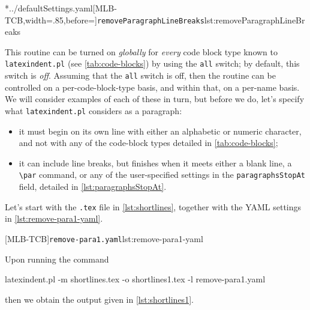 	\cmhlistingsfromfile[style=removeParagraphLineBreaks]*{../defaultSettings.yaml}[MLB-TCB,width=.85\linewidth,before=\centering]{\texttt{removeParagraphLineBreaks}}{lst:removeParagraphLineBreaks}

	This routine can be turned on \emph{globally} for \emph{every}
	code block type known to \texttt{latexindent.pl}
	(see \vref{tab:code-blocks}) by using the
	\texttt{all} switch; by default, this switch is
	\emph{off}. Assuming that the \texttt{all} switch is off,
	then the routine can be controlled on a per-code-block-type basis, and within that, on a
	per-name basis. We will consider examples of each of these in turn, but before we do,
	let's specify what \texttt{latexindent.pl} considers as a paragraph:
	\begin{itemize}
		\item it must begin on its own line with either an alphabetic or numeric character, and not
		      with any of the code-block types detailed in \vref{tab:code-blocks};
		\item it can include line breaks, but finishes when it meets either a blank line, a
		      \lstinline!\par! command, or any of the user-specified settings in the
		      \texttt{paragraphsStopAt} field, detailed in \vref{lst:paragraphsStopAt}.
	\end{itemize}

	Let's start with the \texttt{.tex} file in \cref{lst:shortlines},
	together with the YAML settings in \cref{lst:remove-para1-yaml}.

	\begin{minipage}{.45\linewidth}
	\end{minipage}
	\hfill
	\begin{minipage}{.49\linewidth}
		[MLB-TCB]{\texttt{remove-para1.yaml}}{lst:remove-para1-yaml}
	\end{minipage}

	Upon running the command
	\begin{commandshell}
latexindent.pl -m shortlines.tex -o shortlines1.tex -l remove-para1.yaml
\end{commandshell}
	then we obtain the output given in \cref{lst:shortlines1}.


